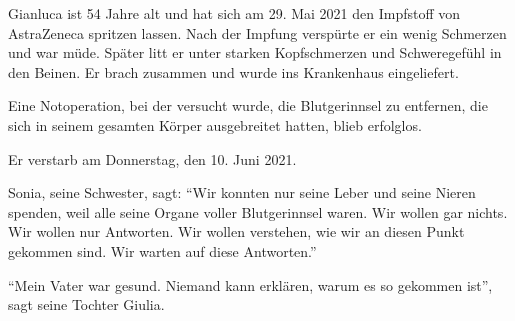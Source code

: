 Gianluca ist 54 Jahre alt und hat sich am 29. Mai 2021 den Impfstoff von
AstraZeneca spritzen lassen. Nach der Impfung verspürte er ein wenig Schmerzen
und war müde. Später litt er unter starken Kopfschmerzen und Schweregefühl in
den Beinen. Er brach zusammen und wurde ins Krankenhaus eingeliefert.

Eine Notoperation, bei der versucht wurde, die Blutgerinnsel zu entfernen, die
sich in seinem gesamten Körper ausgebreitet hatten, blieb erfolglos.

Er verstarb am Donnerstag, den 10. Juni 2021.

Sonia, seine Schwester, sagt: ``Wir konnten nur seine Leber und seine Nieren
spenden, weil alle seine Organe voller Blutgerinnsel waren. Wir wollen gar
nichts. Wir wollen nur Antworten. Wir wollen verstehen, wie wir an diesen Punkt
gekommen sind. Wir warten auf diese Antworten.''

``Mein Vater war gesund. Niemand kann erklären, warum es so gekommen ist'', sagt
seine Tochter Giulia.
